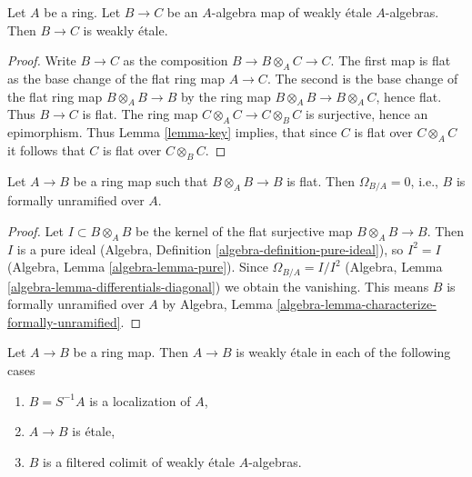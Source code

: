 \begin{lemma}
\label{lemma-weakly-etale-permanence}
Let $A$ be a ring. Let $B \to C$ be an $A$-algebra map of weakly \'etale
$A$-algebras. Then $B \to C$ is weakly \'etale.
\end{lemma}

\begin{proof}
Write $B \to C$ as the composition $B \to B \otimes_A C \to C$.
The first map is flat as the base change of the flat ring map $A \to C$.
The second is the base change of the flat ring map $B \otimes_A B \to B$
by the ring map $B \otimes_A B \to B \otimes_A C$, hence flat.
Thus $B \to C$ is flat. The ring map
$C \otimes_A C \to C \otimes_B C$ is surjective, hence an epimorphism.
Thus Lemma \ref{lemma-key} implies, that since
$C$ is flat over $C \otimes_A C$ it follows that $C$ is
flat over $C \otimes_B C$.
\end{proof}

\begin{lemma}
\label{lemma-formally-unramified}
Let $A \to B$ be a ring map such that $B \otimes_A B \to B$ is flat.
Then $\Omega_{B/A} = 0$, i.e., $B$ is formally unramified over $A$.
\end{lemma}

\begin{proof}
Let $I \subset B \otimes_A B$ be the kernel of the flat surjective map
$B \otimes_A B \to B$. Then $I$ is a pure ideal
(Algebra, Definition \ref{algebra-definition-pure-ideal}),
so $I^2 = I$ (Algebra, Lemma \ref{algebra-lemma-pure}).
Since $\Omega_{B/A} = I/I^2$
(Algebra, Lemma \ref{algebra-lemma-differentials-diagonal})
we obtain the vanishing. This means $B$ is formally unramified over
$A$ by
Algebra, Lemma \ref{algebra-lemma-characterize-formally-unramified}.
\end{proof}

\begin{lemma}
\label{lemma-when-weakly-etale}
Let $A \to B$ be a ring map. Then $A \to B$ is weakly \'etale in each
of the following cases
\begin{enumerate}
\item $B = S^{-1}A$ is a localization of $A$,
\item $A \to B$ is \'etale,
\item $B$ is a filtered colimit of weakly \'etale $A$-algebras.
\end{enumerate}
\end{lemma}

